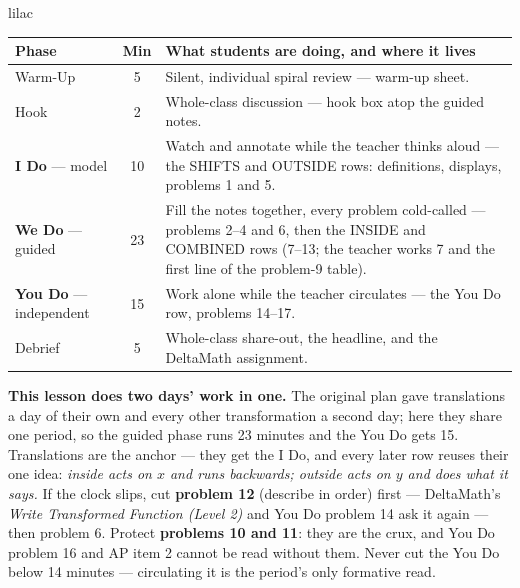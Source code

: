 \documentclass[10pt]{article}
\begin{document}
\boxguard[22]
\begin{skillbox}{lilac}
\small
\renewcommand{\arraystretch}{1.25}
\begin{tabularx}{\linewidth}{@{} l c X @{}}
\textbf{Phase} & \textbf{Min} & \textbf{What students are doing, and where it lives} \\
\midrule
Warm-Up                       & 5  & Silent, individual spiral review --- warm-up sheet. \\
Hook                          & 2  & Whole-class discussion --- hook box atop the guided notes. \\
\textbf{I Do} --- model       & 10 & Watch and annotate while the teacher thinks aloud --- the SHIFTS and OUTSIDE rows: definitions, displays, problems 1 and 5. \\
\textbf{We Do} --- guided     & 23 & Fill the notes together, every problem cold-called --- problems 2--4 and 6, then the INSIDE and COMBINED rows (7--13; the teacher works 7 and the first line of the problem-9 table). \\
\textbf{You Do} --- independent & 15 & Work alone while the teacher circulates --- the You Do row, problems 14--17. \\
Debrief                       & 5  & Whole-class share-out, the headline, and the DeltaMath assignment. \\
\end{tabularx}

\smallskip
\textbf{This lesson does two days' work in one.} The original plan gave translations a day of
their own and every other transformation a second day; here they share one period, so the
guided phase runs 23 minutes and the You Do gets 15. Translations are the anchor ---
they get the I Do, and every later row reuses their one idea: \emph{inside acts on $x$ and
runs backwards; outside acts on $y$ and does what it says.} If the clock slips, cut
\textbf{problem 12} (describe in order) first --- DeltaMath's \textit{Write Transformed Function
(Level 2)} and You Do problem 14 ask it again --- then problem 6. Protect \textbf{problems 10 and 11}: they
are the crux, and You Do problem 16 and AP item 2 cannot be read without them. Never cut the
You Do below 14 minutes --- circulating it is the period's only formative read.
\end{skillbox}
\end{document}
